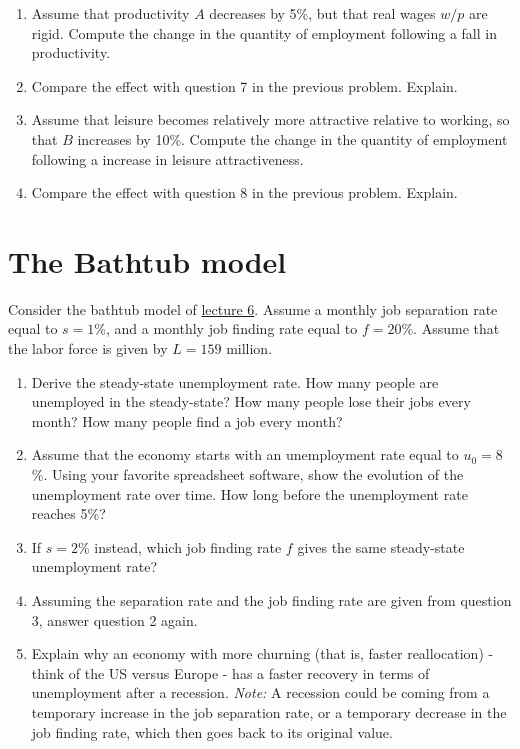 \documentclass[]{book}
\theoremstyle{definition}
\theoremstyle{definition}
\theoremstyle{definition}
\theoremstyle{remark}
\begin{document}
\begin{enumerate}
\def\labelenumi{\arabic{enumi}.}
\item
  Assume that productivity \(A\) decreases by 5\%, but that real wages
  \(w/p\) are rigid. Compute the change in the quantity of employment
  following a fall in productivity.
\item
  Compare the effect with question 7 in the previous problem. Explain.
\item
  Assume that leisure becomes relatively more attractive relative to
  working, so that \(B\) increases by 10\%. Compute the change in the
  quantity of employment following a increase in leisure attractiveness.
\item
  Compare the effect with question 8 in the previous problem. Explain.
\end{enumerate}

\section{The Bathtub model}\label{the-bathtub-model}

Consider the bathtub model of \protect\hyperlink{labor-market}{lecture
6}. Assume a monthly job separation rate equal to \(s=1\)\%, and a
monthly job finding rate equal to \(f=20\)\%. Assume that the labor
force is given by \(L=159\) million.

\begin{enumerate}
\def\labelenumi{\arabic{enumi}.}
\item
  Derive the steady-state unemployment rate. How many people are
  unemployed in the steady-state? How many people lose their jobs every
  month? How many people find a job every month?
\item
  Assume that the economy starts with an unemployment rate equal to
  \(u_0=8\)\%. Using your favorite spreadsheet software, show the
  evolution of the unemployment rate over time. How long before the
  unemployment rate reaches 5\%?
\item
  If \(s=2\)\% instead, which job finding rate \(f\) gives the same
  steady-state unemployment rate?
\item
  Assuming the separation rate and the job finding rate are given from
  question 3, answer question 2 again.
\item
  Explain why an economy with more churning (that is, faster
  reallocation) - think of the US versus Europe - has a faster recovery
  in terms of unemployment after a recession. \emph{Note:} A recession
  could be coming from a temporary increase in the job separation rate,
  or a temporary decrease in the job finding rate, which then goes back
  to its original value.
\end{enumerate}
\end{document}
